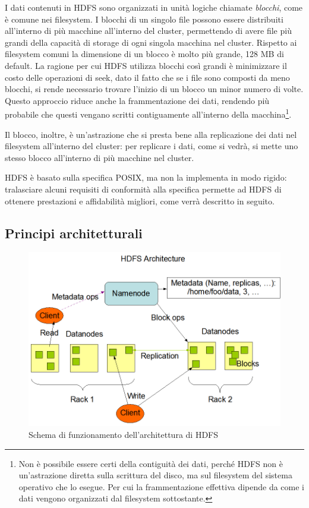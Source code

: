 \documentclass[italian,a4paper, twoside, 12pt]{report}
\begin{document}
I dati contenuti in HDFS sono organizzati in unità logiche chiamate
\emph{blocchi}, come è comune nei filesystem. I blocchi di un singolo
file possono essere distribuiti all'interno di più macchine all'interno
del cluster, permettendo di avere file più grandi della capacità di
storage di ogni singola macchina nel cluster. Rispetto ai filesystem
comuni la dimensione di un blocco è molto più grande, 128 MB di default.
La ragione per cui HDFS utilizza blocchi così grandi è minimizzare il
costo delle operazioni di seek, dato il fatto che se i file sono
composti da meno blocchi, si rende necessario trovare l'inizio di un
blocco un minor numero di volte. Questo approccio riduce anche la
frammentazione dei dati, rendendo più probabile che questi vengano
scritti contiguamente all'interno della macchina\footnote{Non è
  possibile essere certi della contiguità dei dati, perché HDFS non è
  un'astrazione diretta sulla scrittura del disco, ma sul filesystem del
  sistema operativo che lo esegue. Per cui la frammentazione effettiva
  dipende da come i dati vengono organizzati dal filesystem sottostante.}.

Il blocco, inoltre, è un'astrazione che si presta bene alla replicazione
dei dati nel filesystem all'interno del cluster: per replicare i dati,
come si vedrà, si mette uno stesso blocco all'interno di più macchine
nel cluster.

HDFS è basato sulla specifica POSIX, ma non la implementa in modo
rigido: tralasciare alcuni requisiti di conformità alla specifica
permette ad HDFS di ottenere prestazioni e affidabilità migliori, come
verrà descritto in seguito.

\subsection{Principi architetturali}\label{principi-architetturali}

\begin{figure}
\centering
\includegraphics{img/hdfsarchitecture.png}
\caption{Schema di funzionamento dell'architettura di HDFS}
\end{figure}
\end{document}
